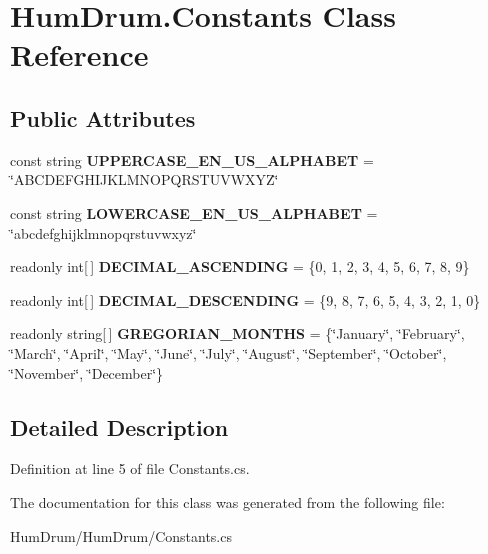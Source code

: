 \hypertarget{classHumDrum_1_1Constants}{}\section{Hum\+Drum.\+Constants Class Reference}
\label{classHumDrum_1_1Constants}
\subsection*{Public Attributes}
\begin{DoxyCompactItemize}
\item 
\hypertarget{classHumDrum_1_1Constants_a5c84cabf6f11daf42d972cbba5727d92}{}const string {\bfseries U\+P\+P\+E\+R\+C\+A\+S\+E\+\_\+\+E\+N\+\_\+\+U\+S\+\_\+\+A\+L\+P\+H\+A\+B\+E\+T} = \char`\"{}A\+B\+C\+D\+E\+F\+G\+H\+I\+J\+K\+L\+M\+N\+O\+P\+Q\+R\+S\+T\+U\+V\+W\+X\+Y\+Z\char`\"{}\label{classHumDrum_1_1Constants_a5c84cabf6f11daf42d972cbba5727d92}

\item 
\hypertarget{classHumDrum_1_1Constants_a3d375baba6dd42c605dcccbe9b81295d}{}const string {\bfseries L\+O\+W\+E\+R\+C\+A\+S\+E\+\_\+\+E\+N\+\_\+\+U\+S\+\_\+\+A\+L\+P\+H\+A\+B\+E\+T} = \char`\"{}abcdefghijklmnopqrstuvwxyz\char`\"{}\label{classHumDrum_1_1Constants_a3d375baba6dd42c605dcccbe9b81295d}

\item 
\hypertarget{classHumDrum_1_1Constants_a814534849abf7d606c65e98ac02c016d}{}readonly int\mbox{[}$\,$\mbox{]} {\bfseries D\+E\+C\+I\+M\+A\+L\+\_\+\+A\+S\+C\+E\+N\+D\+I\+N\+G} = \{0, 1, 2, 3, 4, 5, 6, 7, 8, 9\}\label{classHumDrum_1_1Constants_a814534849abf7d606c65e98ac02c016d}

\item 
\hypertarget{classHumDrum_1_1Constants_a29f50448b47e5329589255efe218f69d}{}readonly int\mbox{[}$\,$\mbox{]} {\bfseries D\+E\+C\+I\+M\+A\+L\+\_\+\+D\+E\+S\+C\+E\+N\+D\+I\+N\+G} = \{9, 8, 7, 6, 5, 4, 3, 2, 1, 0\}\label{classHumDrum_1_1Constants_a29f50448b47e5329589255efe218f69d}

\item 
\hypertarget{classHumDrum_1_1Constants_a904c1a67a15b806e5262fd0301b2040e}{}readonly string\mbox{[}$\,$\mbox{]} {\bfseries G\+R\+E\+G\+O\+R\+I\+A\+N\+\_\+\+M\+O\+N\+T\+H\+S} = \{\char`\"{}January\char`\"{}, \char`\"{}February\char`\"{}, \char`\"{}March\char`\"{}, \char`\"{}April\char`\"{}, \char`\"{}May\char`\"{}, \char`\"{}June\char`\"{}, \char`\"{}July\char`\"{}, \char`\"{}August\char`\"{}, \char`\"{}September\char`\"{}, \char`\"{}October\char`\"{}, \char`\"{}November\char`\"{}, \char`\"{}December\char`\"{}\}\label{classHumDrum_1_1Constants_a904c1a67a15b806e5262fd0301b2040e}

\end{DoxyCompactItemize}


\subsection{Detailed Description}


Definition at line 5 of file Constants.\+cs.



The documentation for this class was generated from the following file\+:\begin{DoxyCompactItemize}
\item 
Hum\+Drum/\+Hum\+Drum/Constants.\+cs\end{DoxyCompactItemize}
